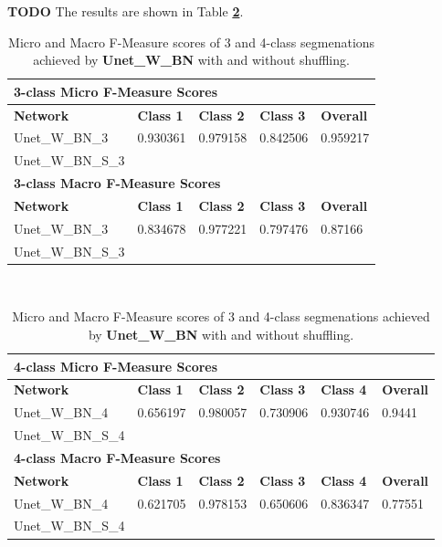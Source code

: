 \textbf{TODO} The results are shown in Table \textbf{\ref{tab:results3}}. \\


\begin {table}
	\begin{flushleft}
		\begin {tabular}[!htb]{|l|l|l|l|l|}
			\hline\multicolumn{5}{|l|}{\textbf{3-class Micro F-Measure Scores}} \\ \hline
			\textbf{Network}& \textbf{Class 1}& \textbf{Class 2}& \textbf{Class 3}& \textbf{Overall} \\ \hline
			Unet\_W\_BN\_3& 0.930361&  0.979158& 0.842506& 0.959217\\ \hline
			Unet\_W\_BN\_S\_3& &  & & \\ \hline
			\multicolumn{5}{|l|}{\textbf{3-class Macro F-Measure Scores}} \\ \hline
			\textbf{Network}& \textbf{Class 1}& \textbf{Class 2}& \textbf{Class 3}& \textbf{Overall} \\ \hline
			Unet\_W\_BN\_3& 0.834678& 0.977221& 0.797476& 0.87166\\ \hline
			Unet\_W\_BN\_S\_3& & & & \\ \hline
		\end {tabular}
		\vspace{0.5cm}\\
		\begin {tabular}[!htb]{|l|l|l|l|l|l|}
			\hline\multicolumn{6}{|l|}{\textbf{4-class Micro F-Measure Scores}} \\ \hline
			\textbf{Network}& \textbf{Class 1}& \textbf{Class 2}& \textbf{Class 3}& \textbf{Class 4}& \textbf{Overall} \\ \hline
			Unet\_W\_BN\_4& 0.656197& 0.980057& 0.730906& 0.930746& 0.9441\\ \hline
			Unet\_W\_BN\_S\_4& & & & & \\ \hline
			\multicolumn{6}{|l|}{\textbf{4-class Macro F-Measure Scores}} \\ \hline
			\textbf{Network}& \textbf{Class 1}& \textbf{Class 2}& \textbf{Class 3}& \textbf{Class 4}& \textbf{Overall} \\ \hline
			Unet\_W\_BN\_4& 0.621705& 0.978153& 0.650606& 0.836347& 0.77551\\ \hline
			Unet\_W\_BN\_S\_4& & & & & \\ \hline
		\end {tabular}
	\end {flushleft}

\caption[Micro and Macro F-Measure scores for a network with Batch Normalization and with or without shuffling.]{Micro and Macro F-Measure scores of 3 and 4-class segmenations achieved by \textbf{Unet\_W\_BN} with and without shuffling.}
\label{tab:results3}
\end {table}


